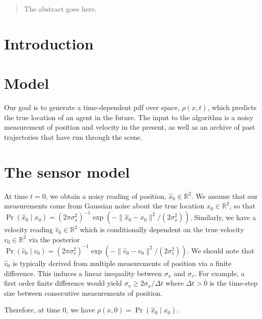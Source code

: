 \documentclass[conference]{IEEEtran}
\begin{document}
\begin{abstract}
The abstract goes here.
\end{abstract}

\IEEEpeerreviewmaketitle

\section{Introduction}

\section{Model}
Our goal is to generate a time-dependent pdf over space, $\rho(x,t)$, which predicts the true location of an agent in the future.
The input to the algorithm is a noisy measurement of position and velocity in the present, as well as an archive of past trajectories that have run through the scene.

\section{The sensor model}
At time $t=0$, we obtain a noisy reading of position, $\hat{x}_0 \in \mathbb{R}^2$.
We assume that our measurements come from Gaussian noise about the true location $x_0 \in \mathbb{R}^2$,
so that $\Pr(\hat{x}_0 \mid x_0 ) = (2\pi \sigma_x^2)^{-1} \exp( - \| \hat{x}_0 - x_0 \|^2 / (2 \sigma_x^2) )$.
Similarly, we have a velocity reading $\hat{v}_0 \in \mathbb{R}^2$ which is conditionally dependent on the true velocity $v_0 \in \mathbb{R}^2$
via the posterior $\Pr( \hat{v}_0 \mid v_0 ) = (2\pi \sigma_v^2)^{-1} \exp( - \| \hat{v}_0 - v_0 \|^2 / (2 \sigma_v^2) )$.
We should note that $\hat{v}_0$ is typically derived from multiple measurements of position via a finite difference.
This induces a linear inequality between $\sigma_x$ and $\sigma_v$.
For example, a first order finite difference would yield $\sigma_v \geq 2 \sigma_x / \Delta t$ where $\Delta t > 0$ is the time-step size between consecutive measurements of position.

Therefore, at time $0$, we have $\rho(x,0) = \Pr(\hat{x}_0 \mid x_0 )$.
\end{document}
